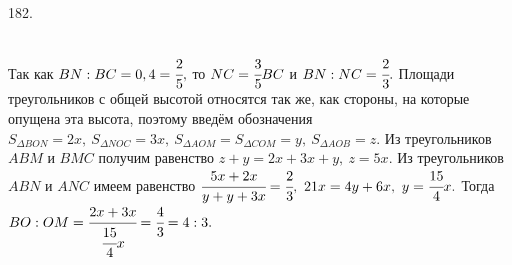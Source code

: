 182. \begin{figure}[ht!]
\end{figure}\\
Так как $BN:BC=0,4=\cfrac{2}{5},$ то $NC=\cfrac{3}{5}BC$ и $BN:NC=\cfrac{2}{3}.$ Площади треугольников с общей высотой относятся так же, как стороны, на которые опущена эта высота, поэтому введём обозначения $S_{\Delta BON}=2x,\ S_{\Delta NOC}=3x,\ S_{\Delta AOM}=S_{\Delta COM}=y,\ S_{\Delta AOB}=z.$ Из треугольников $ABM$ и $BMC$ получим равенство $z+y=2x+3x+y,\ z=5x.$ Из треугольников $ABN$ и $ANC$ имеем равенство $\cfrac{5x+2x}{y+y+3x}=\cfrac{2}{3},\ 21x=4y+6x,\ y=\cfrac{15}{4}x.$
Тогда $BO:OM=\cfrac{2x+3x}{\cfrac{15}{4}x}=\cfrac{4}{3}=4:3.$\\
